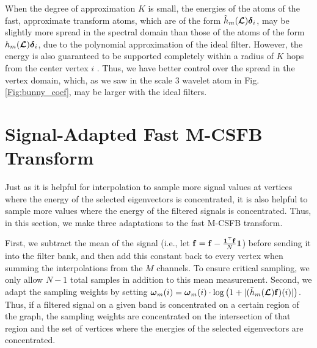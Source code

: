 \documentclass[journal, 10pt]{IEEEtran}
\begin{document}
When the degree of approximation $K$ is small, the energies of the atoms 
of the fast, approximate transform atoms, which are of the form $\tilde{h}_m(\boldsymbol{\mathcal{L}}){\boldsymbol \delta}_i$, may be slightly more spread in the spectral domain than those of the atoms of the form ${h}_m(\boldsymbol{\mathcal{L}}){\boldsymbol \delta}_i$, due to the polynomial approximation of the ideal filter. However, the energy is also guaranteed to be supported completely within a radius of $K$ hops from the center vertex $i$ \cite{hammond2011wavelets,shuman2015vertex}. Thus, we have better control over the spread in the vertex domain, which, as we saw in the scale 3 wavelet atom in Fig. \ref{Fig:bunny_coef}, may be larger with the ideal filters.



\section{Signal-Adapted Fast M-CSFB Transform} \label{Se:signal_adapted}
Just as it is helpful for interpolation to sample more signal values at vertices where the energy of the selected eigenvectors is concentrated, it is also helpful to sample more values where the energy of the filtered signals is concentrated. Thus, in this section, we make three adaptations to the fast M-CSFB transform. 

First, we subtract the mean of the signal (i.e., let ${\bf f}={\bf f}-\frac{{\bf 1}^{\top}{\bf f}}{N} {\bf 1}$) before sending it into the filter bank, and then add this constant back to every vertex when summing the interpolations from the $M$ channels. To ensure critical sampling, we only allow $N-1$ total samples in addition to this mean measurement. Second, we adapt the sampling weights by setting ${\boldsymbol \omega}_m(i) = {\boldsymbol \omega}_m(i) \cdot  \log\left(1+|(\tilde{h}_m(\boldsymbol{\mathcal{L}}){\bf f})(i)|\right)$. Thus, if a filtered signal on a given band is concentrated on a certain region of the graph, the sampling weights 
are concentrated on the intersection of that region and the set of vertices where the energies of the selected eigenvectors are concentrated. %
\end{document}
